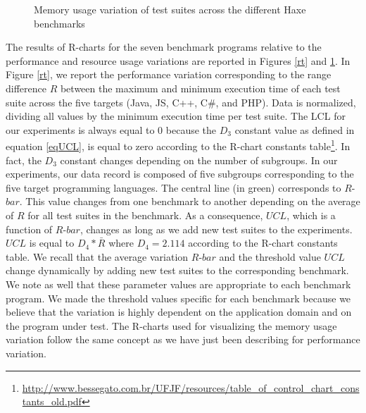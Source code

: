 \begin{figure}
	\caption{Memory usage variation of test suites across the different Haxe benchmarks}
	\label{rm}
\end{figure}
The results of R-charts for the seven benchmark programs relative to the performance and resource usage variations are reported in Figures \ref{rt} and \ref{rm}. In Figure \ref{rt}, we report the performance variation corresponding to the range difference $R$ between the maximum and minimum execution time of each test suite across the five targets (Java, JS, C++, C\#, and PHP). 
Data is normalized, dividing all values by the minimum execution time per test suite. 
The LCL for our experiments is always equal to 0 because the $D_{3}$ constant value as defined in equation \ref{eqUCL}, is equal to zero according to the R-chart constants table\footnote{\url{http://www.bessegato.com.br/UFJF/resources/table_of_control_chart_constants_old.pdf}}. In fact, the $D_{3}$ constant changes depending on the number of subgroups. In our experiments, our data record is composed of five subgroups corresponding to the five target programming languages.
The central line (in green) corresponds to $R$-$bar$. This value changes from one benchmark to another depending on the average of $R$ for all test suites in the benchmark. As a consequence, $UCL$, which is a function of $R$-$bar$, changes as long as we add new test suites to the experiments. $UCL$ is equal to $D_{4}*\bar{R}$ where $D_{4}=2.114$ according to the R-chart constants table. We recall that the average variation $R$-$bar$ and the threshold value $UCL$ change dynamically by adding new test suites to the corresponding benchmark. 
We note as well that these parameter values are appropriate to each benchmark program. We made the threshold values specific for each benchmark because we believe that the variation is highly dependent on the application domain and on the program under test. The R-charts used for visualizing the memory usage variation follow the same concept as we have just been describing for performance variation.  

